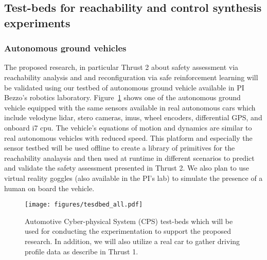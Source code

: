 
\subsection{Test-beds for reachability and control synthesis experiments}



\subsubsection{Autonomous ground vehicles}
The proposed research, in particular Thrust 2 about safety assessment via reachability analysis and and reconfiguration via safe reinforcement learning will be validated using our testbed of autonomous ground vehicle available in PI Bezzo's robotics laboratory. Figure~\ref{fig:all_experiments} shows one of the autonomous ground vehicle equipped with the same sensors available in real autonomous cars which include velodyne lidar, stero cameras, imus, wheel encoders, differential GPS, and onboard i7 cpu. The vehicle's equations of motion and dynamics are similar to real autonomous vehicles with reduced speed. This platform and especially the sensor testbed will be used offline to create a library of primitives for the reachability analaysis and then used at runtime in different scenarios to predict and validate the safety assessment presented in Thrust 2. We also plan to use virtual reality goggles (also available in the PI's lab) to simulate the presence of a human on board the vehicle. 
\begin{figure}
    \centering
    \texttt{[image: figures/tesdbed\_all.pdf]}
    \caption{Automotive Cyber-physical System (CPS) test-beds which will be used for conducting the experimentation to support the proposed research. In addition, we will also utilize a real car to gather driving profile data as describe in Thrust 1. }
    \label{fig:all_experiments}
\end{figure}
